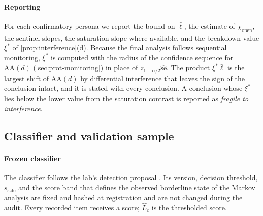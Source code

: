 \paragraph{Reporting}
For each confirmatory persona we report the bound on $\bar\ell$, the estimate of $\chi_{\mathrm{open}}$, the sentinel slopes, the saturation slope where available, and the breakdown value $\xi^\ast$ of \cref{prop:interference}(d). Because the final analysis follows sequential monitoring, $\xi^\ast$ is computed with the radius of the confidence sequence for $\mathrm{AA}(d)$ (\cref{sec:prot-monitoring}) in place of $z_{1-\alpha/2}\widehat{\mathrm{se}}$. The product $\xi^\ast\bar\ell$ is the largest shift of $\mathrm{AA}(d)$ by differential interference that leaves the sign of the conclusion intact, and it is stated with every conclusion. A conclusion whose $\xi^\ast$ lies below the lower value from the saturation contrast is reported as \emph{fragile to interference}.

\subsection{Classifier and validation sample}\label{sec:prot-validation}

\paragraph{Frozen classifier}
The classifier follows the lab's detection proposal \citep{kornsteinlab2026detection}. Its version, decision threshold, $s_{\mathrm{safe}}$ and the score band that defines the observed borderline state of the Markov analysis are fixed and hashed at registration and are not changed during the audit. Every recorded item receives a score; $\widehat L_c$ is the thresholded score.

